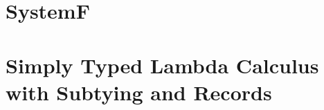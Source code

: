 \chapter{SystemF}
\label{appendix:systemf}




\chapter{Simply Typed Lambda Calculus with Subtying and Records}
\label{appendix:stlc-records}

